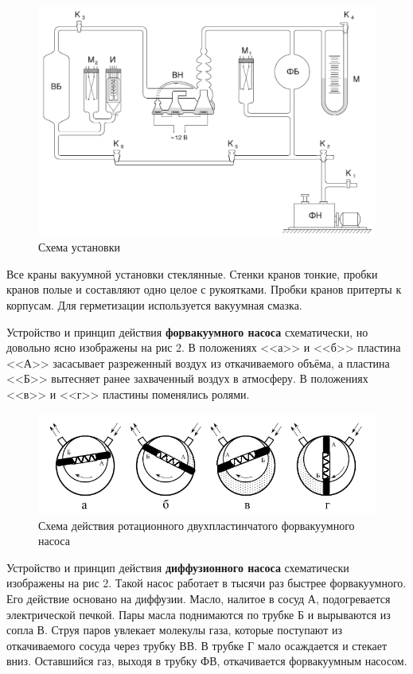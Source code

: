 \documentclass[a4paper,12pt]{article} %
\begin{document}
 
  \begin{figure}[!h]
 	\centering
 	\includegraphics[width=0.7\linewidth]{установка.png}
 	\caption[]{Схема установки}
 
 \end{figure}
 
 
\noindent Все краны вакуумной установки стеклянные. Стенки кранов тонкие, пробки кранов полые и составляют одно целое с рукоятками. Пробки кранов притерты к корпусам. Для герметизации используется вакуумная смазка.

\medskip

\noindent Устройство и принцип действия \textbf{форвакуумного насоса} схематически, но довольно ясно изображены на рис 2. В положениях <<а>> и <<б>> пластина <<А>> засасывает разреженный воздух из откачиваемого объёма, а пластина <<Б>> вытесняет ранее захваченный воздух в атмосферу. В положениях <<в>> и <<г>> пластины поменялись ролями.

\begin{figure}[!h]
	\centering
	\includegraphics[width=0.9\linewidth]{фв.png}
	\caption[]{Схема действия ротационного двухпластинчатого форвакуумного насоса}
	
\end{figure}


\noindent Устройство и принцип действия \textbf{диффузионного насоса} схематически изображены на рис 2. Такой насос работает в тысячи раз быстрее форвакуумного. Его действие основано на диффузии. Масло, налитое в сосуд А, подогревается электрической печкой. Пары масла поднимаются по трубке Б и вырываются из сопла В. Струя паров увлекает молекулы газа, которые поступают из откачиваемого сосуда через трубку ВВ. В трубке Г мало осаждается и стекает вниз. Оставшийся газ, выходя в трубку ФВ, откачивается форвакуумным насосом.
\end{document}
